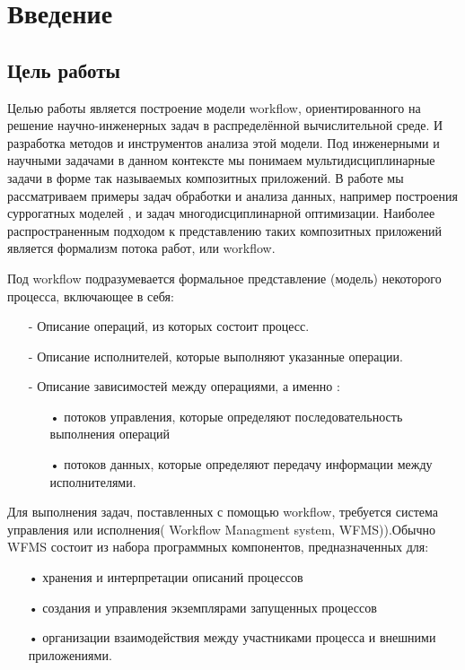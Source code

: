 \documentclass[a4paper,14pt]{article}
\begin{document}
\textwidth 15.5cm
\topmargin -1cm
\parindent 1cm
\textheight 24cm
\parskip 1.5mm



\section{Введение}
\subsection*{Цель работы}
Целью работы является построение модели workflow, ориентированного  на решение научно-инженерных задач в распределённой вычислительной среде. И разработка методов и инструментов анализа этой модели.
 Под инженерными и научными задачами в данном контексте мы понимаем 
мультидисциплинарные задачи в форме так называемых композитных приложений. В работе мы рассматриваем примеры задач обработки и анализа данных, например построения  суррогатных моделей , и задач многодисциплинарной оптимизации. Наиболее распространенным подходом к представлению таких композитных приложений является формализм потока работ, или workflow.

Под workflow подразумевается формальное представление (модель) некоторого процесса, включающее в себя:
\begin{enumerate}
\item[-] Описание операций, из которых состоит процесс.
\item[-] Описание исполнителей, которые выполняют указанные операции.
\item[-] Описание зависимостей между операциями, а именно :
\begin{enumerate}
\item[•] потоков управления, которые определяют последовательность выполнения операций 
\item[•] потоков данных, которые
определяют передачу информации между исполнителями.
\end{enumerate}
\end{enumerate}


Для выполнения задач, поставленных с помощью workflow, требуется система управления или исполнения( Workflow Managment system, WFMS)).Обычно WFMS состоит из набора программных
компонентов, предназначенных для:
\begin{enumerate}
\item[•] хранения и интерпретации описаний
процессов 
\item[•] создания и управления экземплярами запущенных процессов
\item[•] организации взаимодействия между участниками
процесса и внешними приложениями.
\end{enumerate}
\end{document}
